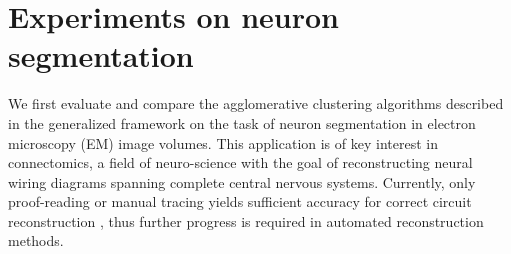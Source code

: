 


\section{Experiments on neuron segmentation}\label{sec:neuro_segm_exp}

We first evaluate and compare the agglomerative clustering algorithms described in the generalized framework on the task of neuron segmentation in electron microscopy (EM) image volumes. This application is of key interest in connectomics, a field of neuro-science with the goal of reconstructing neural wiring diagrams spanning complete central nervous systems. Currently, only proof-reading or manual tracing yields sufficient accuracy for correct circuit reconstruction \cite{schlegel2017learning}, thus further progress is required in automated reconstruction methods.

